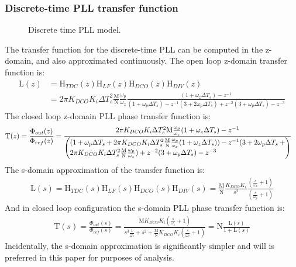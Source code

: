 \subsubsection{Discrete-time PLL transfer function}
	\begin{figure}[htb!]
		\center
		\caption{Discrete time PLL model.}
		\label{fig:discrete_pll2}
	\end{figure}
	\FloatBarrier
	The transfer function for the discrete-time PLL can be computed in the z-domain, and also approximated continuously. The open loop z-domain transfer function is:
	\begin{align}
		\mathrm{L}(z) &= \mathrm{H}_{TDC}(z)\mathrm{H}_{LF}(z)\mathrm{H}_{DCO}(z)\mathrm{H}_{DIV}(z) \\
		&= 2\pi K_{DCO}K_i\Delta T_s^2\frac{\mathrm{M}}{\mathrm{N}}\frac{\omega_p}{\omega_z}\frac{(1+\omega_z\Delta T_s)-z^{-1}}{(1+\omega_p\Delta T_s) - z^{-1}(3+2\omega_p\Delta T_s) + z^{-2}(3+\omega_p\Delta T_s) - z^{-3}}\label{eq:z_open_loop}
	\end{align}
	The closed loop z-domain PLL phase transfer function is:
	\begin{align}
		\mathrm{T}(z) = \frac{\Phi_{out}(z)}{\Phi_{ref}(z)} &= \frac{2\pi K_{DCO}K_i\Delta T_s^2\mathrm{M}\frac{\omega_p}{\omega_z}(1+\omega_z\Delta T_s)-z^{-1}}{\left(\parbox{4.2in}{$(1+\omega_p\Delta T_s + 2\pi K_{DCO}K_i\Delta T_s^2\frac{\mathrm{M}}{\mathrm{N}}\frac{\omega_p}{\omega_z}(1+\omega_z\Delta T_s))- z^{-1}(3+2\omega_p\Delta T_s+2\pi K_{DCO}K_i\Delta T_s^2\frac{\mathrm{M}}{\mathrm{N}}\frac{\omega_p}{\omega_z})+ z^{-2}(3+\omega_p\Delta T_s) - z^{-3}$}\right)}%
	\end{align}
	The s-domain approximation of the transfer function is:
	\begin{align}
		\mathrm{L}(s) = \mathrm{H}_{TDC}(s)\mathrm{H}_{LF}(s)\mathrm{H}_{DCO}(s)\mathrm{H}_{DIV}(s) = \frac{\mathrm{M}}{\mathrm{N}}\frac{K_{DCO}K_i}{s^2} \frac{\left(\frac{s}{\omega_z} + 1\right)}{\left(\frac{s}{\omega_p} + 1\right)}
	\end{align}
	And in closed loop configuration the s-domain PLL phase transfer function is:
	\begin{align}
		\mathrm{T}(s)=\frac{\Phi_{out}(s)}{\Phi_{ref}(s)} = \frac{\mathrm{M}K_{DCO}K_i\left(\frac{s}{\omega_z} + 1\right)}{s^3\frac{1}{\omega_z} + s^2 + \frac{\mathrm{M}}{\mathrm{N}}K_{DCO}K_i\left(\frac{s}{\omega_z} + 1\right)} = \mathrm{N}\frac{\mathrm{L}(s)}{1+\mathrm{L}(s)}
	\end{align}
	Incidentally, the s-domain approximation is significantly simpler and will is preferred in this paper for purposes of analysis.

